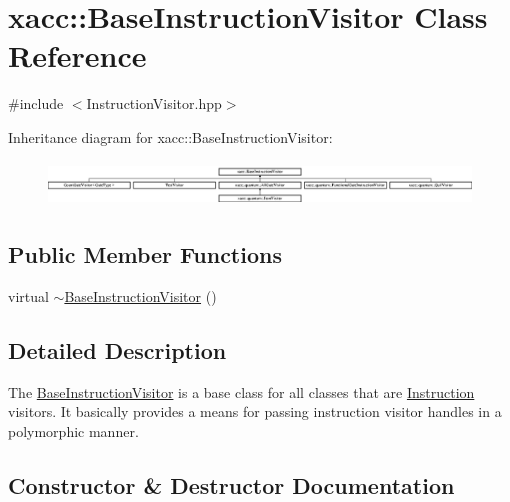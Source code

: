 \hypertarget{a02468}{}\section{xacc\+:\+:Base\+Instruction\+Visitor Class Reference}
\label{a02468}


{\ttfamily \#include $<$Instruction\+Visitor.\+hpp$>$}

Inheritance diagram for xacc\+:\+:Base\+Instruction\+Visitor\+:\begin{figure}[H]
\begin{center}
\leavevmode
\includegraphics[height=1.183099cm]{a02468}
\end{center}
\end{figure}
\subsection*{Public Member Functions}
\begin{DoxyCompactItemize}
\item 
virtual \hyperlink{a02468_aa6f5104f5868fe1eca9be4dc4036eba4}{$\sim$\+Base\+Instruction\+Visitor} ()
\end{DoxyCompactItemize}


\subsection{Detailed Description}
The \hyperlink{a02468}{Base\+Instruction\+Visitor} is a base class for all classes that are \hyperlink{a02460}{Instruction} visitors. It basically provides a means for passing instruction visitor handles in a polymorphic manner. 

\subsection{Constructor \& Destructor Documentation}
\mbox{\label{a02468_aa6f5104f5868fe1eca9be4dc4036eba4}} 
